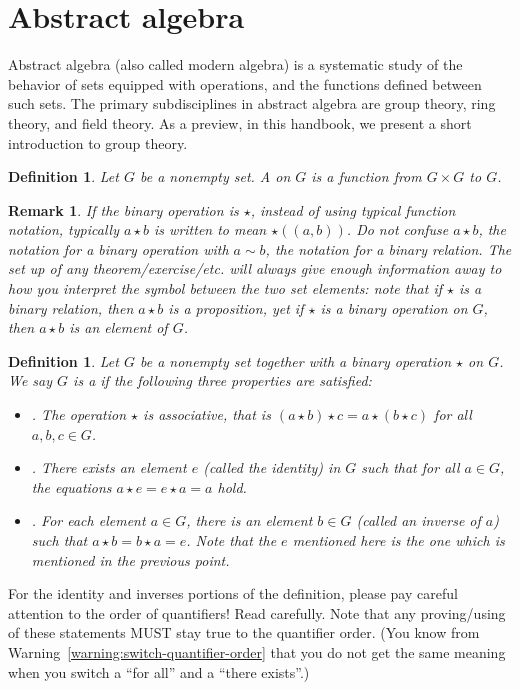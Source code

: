 \documentclass{book}
\newcounter{ekcounter}%
\theoremstyle{ekimcustom}
\newtheorem{remark}[ekcounter]{Remark}
\newtheorem{definition}[ekcounter]{Definition}
\newcommand\defn[1]{{\color{blue}{\bf #1}}}
\begin{document}
\section{Abstract algebra}

Abstract algebra (also called modern algebra) is a systematic study of the behavior of sets equipped with operations, and the functions defined between such sets. The primary subdisciplines in abstract algebra are group theory, ring theory, and field theory. As a preview, in this handbook, we present a short introduction to group theory.

\begin{definition}
Let $G$ be a nonempty set.  A \defn{binary operation} on $G$ is a function from $G \times G$ to $G$.
\end{definition}

\begin{remark}
If the binary operation is $\star$, instead of using typical function notation, typically $a \star b$ is written to mean $\star((a,b))$. Do not confuse $a \star b$, the notation for a binary operation with $a \sim b$, the notation for a binary relation. The set up of any theorem/exercise/etc. will always give enough information away to how you interpret the symbol between the two set elements: note that if $\star$ is a binary relation, then $a \star b$ is a proposition, yet if $\star$ is a binary operation on $G$, then $a \star b$ is an element of $G$.
\end{remark}

\begin{definition}
Let $G$ be a nonempty set together with a binary operation $\star$ on $G$.  We say $G$ is a \defn{group under the operation $\star$} if the following three properties are satisfied:
\begin{itemize}
	\item\underline{}. The operation $\star$ is associative, that is $(a\star b)\star c = a\star (b\star c)$ for all $a,b,c \in G$.
	\item\underline{}. There exists an element $e$ (called the identity) in $G$ such that  for all $a \in G$, the equations $a\star e = e\star a = a$ hold.
	\item\underline{}. For each element $a \in G$, there is an element $b \in G$ (called an inverse of $a$) such that $a\star b = b\star a = e$. Note that the $e$ mentioned here is the one which is mentioned in the previous point.
\end{itemize}
\end{definition}
\begin{bwarning}{}{}
For the identity and inverses portions of the definition, please pay careful attention to the order of quantifiers! Read carefully. Note that any proving/using of these statements MUST stay true to the quantifier order. (You know from Warning~\ref{warning:switch-quantifier-order} that you do not get the same meaning when you switch a ``for all'' and a ``there exists''.)
\end{bwarning}
\end{document}
